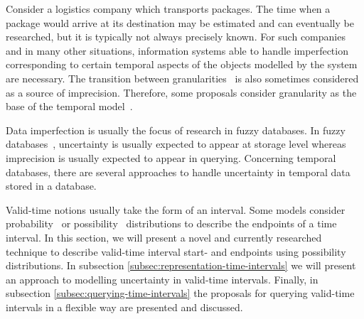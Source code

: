 %
%
Consider a logistics company which transports packages. The time when a package would arrive at its destination may be estimated and can eventually be researched, but it is typically not always precisely known. For such companies and in many other situations, information systems able to handle imperfection corresponding to certain temporal aspects of the objects modelled by the system are necessary. The transition between granularities~\cite{Lin97} is also sometimes considered as a source of imprecision. Therefore, some proposals consider granularity as the base of the temporal model~\cite{Cru97}.

Data imperfection is usually the focus of research in fuzzy databases. In fuzzy databases~\cite{Galindo2006}, uncertainty is usually expected to appear at storage level whereas imprecision is usually expected to appear in querying. Concerning temporal databases, there are several approaches to handle uncertainty in temporal data stored in a database.

Valid-time notions usually take the form of an interval. Some models consider probability~\cite{Dekhtyar2001} or possibility~\cite{Dubois89} distributions to describe the endpoints of a time interval. In this section, we will present a novel and currently researched technique to describe valid-time interval start- and endpoints using possibility distributions. In subsection \ref{subsec:representation-time-intervals} we will present an approach to modelling uncertainty in valid-time intervals. Finally, in subsection \ref{subsec:querying-time-intervals} the proposals for querying valid-time intervals in a flexible way are presented and discussed.%


